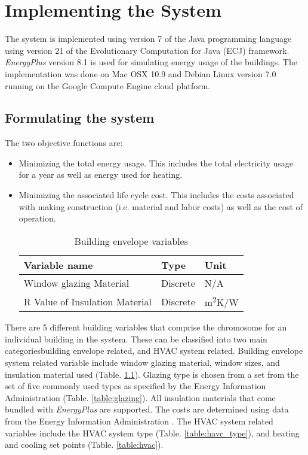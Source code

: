 %
%
%
\chapter{Implementing the System} \label{ch:method}
The system is implemented using version 7 of the Java programming language using version 21 of the Evolutionary Computation for Java (ECJ) framework. \textit{EnergyPlus} version 8.1 is used for simulating energy usage of the buildings. The implementation was done on Mac OSX 10.9 and Debian Linux version 7.0 running on the Google Compute Engine cloud platform.

\section{Formulating the system}

The two objective functions are:
\begin{itemize}
\item Minimizing the total energy usage. This includes the total electricity usage for a year as well as energy used for heating.
\item Minimizing the associated life cycle cost. This includes the costs associated with making construction (i.e. material and labor costs) as well as the cost of operation.

\begin{table}[htbp]
    \centering
    \begin{tabular}{|l|l|l|}
    \hline
    Variable name                  & Type       & Unit                      \\ \hline
    Window glazing Material        & Discrete   & N/A                      \\
    R Value of Insulation Material & Discrete   & m\textsuperscript{2}K/W   \\ \hline
    \end{tabular}
    \caption{Building envelope variables }
    \label{table:envelope}
\end{table}

\end{itemize}

There are 5 different building variables that comprise the chromosome for an individual building in the system. These can be classified into two main categories\textemdash building envelope related, and HVAC system related. Building envelope system related variable include window glazing material, window sizes, and insulation material used (Table. \ref{table:envelope}). Glazing type is chosen from a set from the set of five commonly used types as specified by the Energy Information Administration (Table. \ref{table:glazing}). All insulation materials that come bundled with \textit{EnergyPlus} are supported. The costs are determined using data from the Energy Information Administration \cite{eia}. The HVAC system related variables include the HVAC system type (Table. \ref{table:havc_type}), and heating and cooling set points (Table. \ref{table:hvac}).

